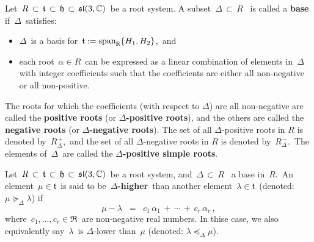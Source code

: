 \vskip 0.5cm
\begin{definition}
\mbox{}
\vskip 0.05cm
\noindent
Let
\,$R \,\subset\, \mathfrak{t} \,\subset\, \mathfrak{h} \,\subset\, \mathfrak{sl}(3,\mathbb{C})$\,
be a root system.
A subset \,$\Delta \,\subset\, R$ \, is called a \textbf{base} if \,$\Delta$\, satisfies:
\begin{itemize}
\item
    $\Delta$\, is a basis for \,$\mathfrak{t} := \textnormal{span}_{\mathbb{R}}\{H_{1},H_{2}\}$,\, and
\item
    each root \,$\alpha \in R$\, can be expressed as a linear combination of elements
    in \,$\Delta$\, with integer coefficients such that
    the coefficients are either all non-negative or all non-positive.
\end{itemize}
The roots for which the coefficients (with respect to $\Delta$) are all non-negative
are called the \textbf{positive roots} (or \textbf{$\Delta$-positive roots}), and the others
are called the \textbf{negative roots} (or \textbf{$\Delta$-negative roots}).
The set of all $\Delta$-positive roots in $R$ is denoted by \,$R^{\,+}_{\Delta}$,\,
and
the set of all $\Delta$-negative roots in $R$ is denoted by \,$R^{\,-}_{\Delta}$.\,
\vskip 0.1cm
\noindent
The elements of \,$\Delta$\, are called the \textbf{$\Delta$-positive simple roots}.
\end{definition}


\vskip 0.5cm
\begin{definition}
\mbox{}
\vskip 0.05cm
\noindent
Let
\,$R \,\subset\, \mathfrak{t} \,\subset\, \mathfrak{h} \,\subset\, \mathfrak{sl}(3,\mathbb{C})$\,
be a root system, and
\,$\Delta \,\subset\, R$ \, a base in \,$R$.\,
\vskip 0.1cm
\noindent
An element \,$\mu \in \mathfrak{t}$\, is said to be \,\textbf{$\Delta$-higher}\,
than another element \,$\lambda \in \mathfrak{t}$\, (denoted: $\mu \succeq_{\Delta} \lambda$) if
\begin{equation*}
\mu - \lambda
\;\; = \;\;
    c_{1}\,\alpha_{1} \,+\, \cdots \,+\, c_{r}\,\alpha_{r}\,,
\end{equation*}
where \,$c_{1}, \ldots, c_{r} \in \Re$\, are non-negative real numbers.
In thise case, we also equivalently say \,$\lambda$\, is $\Delta$-lower than \,$\mu$
(denoted: $\lambda \preceq_{\Delta} \mu$).\,
\end{definition}


